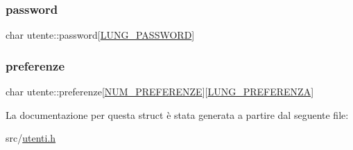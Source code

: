 \subsubsection{\texorpdfstring{password}{password}}
{\footnotesize\ttfamily char utente\+::password\mbox{[}\hyperlink{utenti_8h_ad21198b3cb8d2fe2c3d8fb67746bf172}{L\+U\+N\+G\+\_\+\+P\+A\+S\+S\+W\+O\+RD}\mbox{]}}

\mbox{\label{structutente_a249611b72057202c1a4b7a76007e48be}} 
\subsubsection{\texorpdfstring{preferenze}{preferenze}}
{\footnotesize\ttfamily char utente\+::preferenze\mbox{[}\hyperlink{utenti_8h_afd3f4e6f098069fc2af012d2e454443a}{N\+U\+M\+\_\+\+P\+R\+E\+F\+E\+R\+E\+N\+ZE}\mbox{]}\mbox{[}\hyperlink{utenti_8h_a0fd5baff776b4f5be964c2f6383f415a}{L\+U\+N\+G\+\_\+\+P\+R\+E\+F\+E\+R\+E\+N\+ZA}\mbox{]}}



La documentazione per questa struct è stata generata a partire dal seguente file\+:\begin{DoxyCompactItemize}
\item 
src/\hyperlink{utenti_8h}{utenti.\+h}\end{DoxyCompactItemize}

